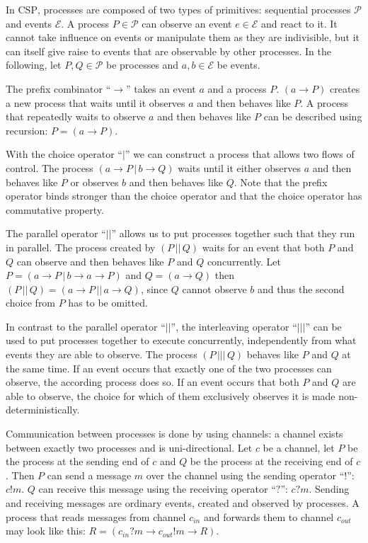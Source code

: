 In \textsc{CSP}, processes are composed of two types of primitives: sequential processes $\mathcal{P}$ and events $\mathcal{E}$. A process $P \in \mathcal{P}$ can observe an event $e \in \mathcal{E}$ and react to it. It cannot take influence on events or manipulate them as they are indivisible, but it can itself give raise to events that are observable by other processes. In the following, let $P, Q \in \mathcal{P}$ be processes and $a,b \in \mathcal{E}$ be events.

The prefix combinator \enquote{$\to$} takes an event $a$ and a process $P$. $\left( a \to P \right)$ creates a new process that waits until it observes $a$ and then behaves like $P$. A process that repeatedly waits to observe $a$ and then behaves like $P$ can be described using recursion: $P = \left( a \to P \right)$.

With the choice operator \enquote{$|$} we can construct a process that allows two flows of control. The process $\left( a \to P \,|\, b \to Q \right)$ waits until it either observes $a$ and then behaves like $P$ or observes $b$ and then behaves like $Q$. Note that the prefix operator binds stronger than the choice operator and that the choice operator has commutative property.

The parallel operator \enquote{$||$} allows us to put processes together such that they run in parallel. The process created by $\left( P \,||\, Q \right)$ waits for an event that both $P$ and $Q$ can observe and then behaves like $P$ and $Q$ concurrently. Let $P = \left( a \to P \,|\, b \to a \to P \right)$ and $Q = \left( a \to Q \right)$ then $\left( P \,||\, Q \right) = \left( a \to P \,||\, a \to Q \right)$, since $Q$ cannot observe $b$ and thus the second choice from $P$ has to be omitted.

In contrast to the parallel operator \enquote{$||$}, the interleaving operator \enquote{$|||$} can be used to put processes together to execute concurrently, independently from what events they are able to observe. The process $\left( P \,|||\, Q \right)$ behaves like $P$ and $Q$ at the same time. If an event occurs that exactly one of the two processes can observe, the according process does so. If an event occurs that both $P$ and $Q$ are able to observe, the choice for which of them exclusively observes it is made non-deterministically.

Communication between processes is done by using channels: a channel exists between exactly two processes and is uni-directional. Let $c$ be a channel, let $P$ be the process at the sending end of $c$ and $Q$ be the process at the receiving end of $c$. Then $P$ can send a message $m$ over the channel using the sending operator \enquote{$!$}: $c!m$. $Q$ can receive this message using the receiving operator \enquote{$?$}: $c?m$. Sending and receiving messages are ordinary events, created and observed by processes. A process that reads messages from channel $c_{in}$ and forwards them to channel $c_{out}$ may look like this: $R = \left( c_{in}?m \to c_{out}!m \to R \right)$.

